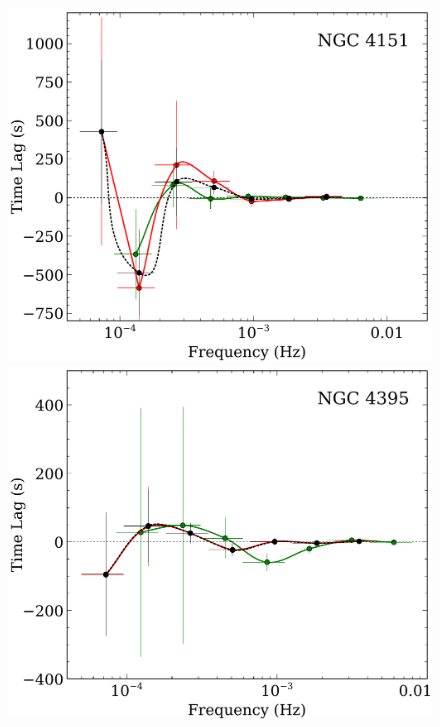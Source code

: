 \documentclass{article}
\begin{document}
\begin{figure}
\includegraphics[scale=0.4]{images/NGC4151-lag-results-lo-hi-flux-FP.pdf}
\includegraphics[scale=0.4]{images/NGC4395-lag-results-lo-hi-flux-FP.pdf}\\
\vspace{0.5cm}

\end{figure}
\end{document}
